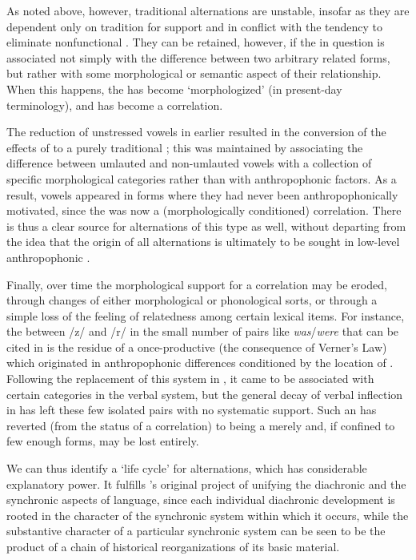 As noted above, however, traditional alternations are unstable,
insofar as they are dependent only on tradition for support and in
conflict with the tendency to eliminate nonfunctional . They
can be retained, however, if the  in question is associated
not simply with the difference between two arbitrary related forms,
but rather with some morphological or semantic aspect of their
relationship. When this happens, the  has become
`morphologized' (in present-day terminology), and has become a
correlation.

The reduction of unstressed vowels in earlier  resulted in the
conversion of the effects of  to a purely traditional
; this  was maintained by associating the
difference between umlauted and non-umlauted vowels with a collection
of specific morphological categories rather than with anthropophonic
factors. As a result,  vowels appeared in forms where they had
never been anthropophonically motivated, since the  was now
a (morphologically conditioned) correlation. There is thus a clear
source for alternations of this type as well, without departing from
the idea that the origin of all alternations is ultimately to be
sought in low-level anthropophonic .

Finally, over time the morphological support for a correlation may be
eroded, through changes of either morphological or phonological sorts,
or through a simple loss of the feeling of relatedness among certain
lexical items. For instance, the  between /z/ and /r/ in
the small number of pairs like \emph{was}/\emph{were} that can be
cited in  is the residue of a once-productive  (the
consequence of Verner's Law) which originated in anthropophonic
differences conditioned by the location of  . Following the
replacement of this  system in , it came to be
associated with certain categories in the verbal system, but the
general decay of verbal inflection in  has left these few
isolated pairs with no systematic support. Such an  has
reverted (from the status of a correlation) to being a merely
 and, if confined to few enough forms, may be
lost entirely.

We can thus identify a `life cycle' for alternations, which has
considerable explanatory power. It fulfills {\Baudouin}'s original
project of unifying the diachronic and the synchronic aspects of
language, since each individual diachronic development is rooted in
the character of the synchronic system within which it occurs, while
the substantive character of a particular synchronic system can be
seen to be the product of a chain of historical reorganizations of its
basic material.

